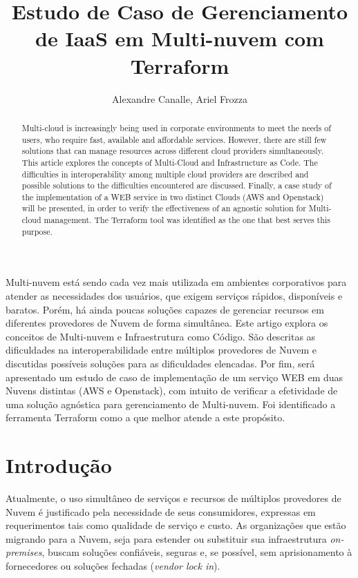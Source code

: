 \documentclass[12pt]{article}
\title{Estudo de Caso de Gerenciamento de IaaS em Multi-nuvem com Terraform}
\author{Alexandre Canalle\inst{1}, Ariel Frozza\inst{1}}
\begin{document}
\sloppy
\maketitle
	
\begin{abstract}
	Multi-cloud is increasingly being used in corporate environments to meet the needs of users, who require fast, available and affordable services. However, there are still few solutions that can manage resources across different cloud providers simultaneously. This article explores the concepts of Multi-Cloud and Infrastructure as Code. The difficulties in interoperability among multiple cloud providers are described and possible solutions to the difficulties encountered are discussed. Finally, a case study of the implementation of a WEB service in two distinct Clouds (AWS and Openstack) will be presented, in order to verify the effectiveness of an agnostic solution for Multi-cloud management. The Terraform tool was identified as the one that best serves this purpose.
\end{abstract}

\begin{resumo} 
	Multi-nuvem está sendo cada vez mais utilizada em ambientes corporativos para atender as necessidades dos usuários, que exigem serviços rápidos, disponíveis e baratos. Porém, há ainda poucas soluções capazes de gerenciar recursos em diferentes provedores de Nuvem de forma simultânea. Este artigo explora os conceitos de Multi-nuvem e Infraestrutura como Código. São descritas as dificuldades na interoperabilidade entre múltiplos provedores de Nuvem e discutidas possíveis soluções para as dificuldades elencadas. Por fim, será apresentado um estudo de caso de implementação de um serviço WEB em duas Nuvens distintas (AWS e Openstack), com intuito de verificar a efetividade de uma solução agnóstica para gerenciamento de Multi-nuvem. Foi identificado a ferramenta Terraform como a que melhor atende a este propósito.
\end{resumo}

	\section{Introdução}
	Atualmente, o uso simultâneo de serviços e recursos de múltiplos provedores de Nuvem é justificado pela necessidade de seus consumidores, expressas em requerimentos tais como qualidade de serviço e custo. As organizações que estão migrando para a Nuvem, seja para estender ou substituir sua infraestrutura \textit{on-premises}, buscam soluções confiáveis, seguras e, se possível, sem aprisionamento à fornecedores ou soluções fechadas (\textit{vendor lock in}).
	    
\end{document}
